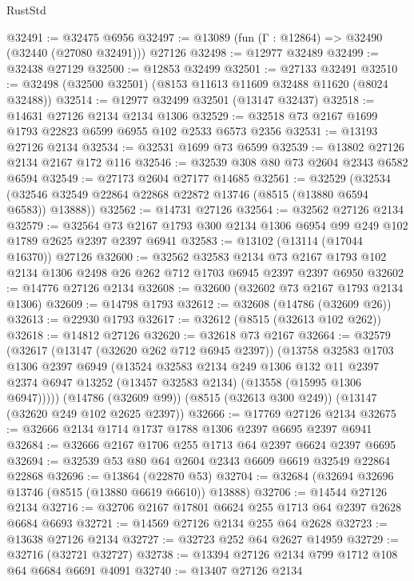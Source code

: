 \begin{lexlean}{RustStd}
\begin{coremodule}
@32491 := @32475 @6956
@32497 := @13089 (fun (Γ : @12864) => @32490 (@32440 (@27080 @32491))) @27126
@32498 := @12977 @32489
@32499 := @32438 @27129
@32500 := @12853 @32499
@32501 := @27133 @32491
@32510 := @32498 (@32500 @32501) (@8153 @11613 @11609 @32488 @11620 (@8024 @32488))
@32514 := @12977 @32499 @32501 (@13147 @32437)
@32518 := @14631 @27126 @2134 @2134 @1306
@32529 := @32518 @73 @2167 @1699 @1793 @22823 @6599 @6955 @102 @2533 @6573 @2356
@32531 := @13193 @27126 @2134
@32534 := @32531 @1699 @73 @6599
@32539 := @13802 @27126 @2134 @2167 @172 @116
@32546 := @32539 @308 @80 @73 @2604 @2343 @6582 @6594
@32549 := @27173 @2604 @27177 @14685
@32561 := @32529
    (@32534 (@32546 @32549 @22864 @22868 @22872 @13746 (@8515 (@13880 @6594 @6583)) @13888))
@32562 := @14731 @27126
@32564 := @32562 @27126 @2134
@32579 := @32564 @73 @2167 @1793 @300 @2134 @1306 @6954 @99 @249 @102 @1789 @2625 @2397 @2397 @6941
@32583 := @13102 (@13114 (@17044 @16370)) @27126
@32600 := @32562
    @32583
    @2134
    @73
    @2167
    @1793
    @102
    @2134
    @1306
    @2498
    @26
    @262
    @712
    @1703
    @6945
    @2397
    @2397
    @6950
@32602 := @14776 @27126 @2134
@32608 := @32600 (@32602 @73 @2167 @1793 @2134 @1306)
@32609 := @14798 @1793
@32612 := @32608 (@14786 (@32609 @26))
@32613 := @22930 @1793
@32617 := @32612 (@8515 (@32613 @102 @262))
@32618 := @14812 @27126
@32620 := @32618 @73 @2167
@32664 := @32579
    (@32617
      (@13147 (@32620 @262 @712 @6945 @2397))
      (@13758
        @32583
        @1703
        @1306
        @2397
        @6949
        (@13524
          @32583
          @2134
          @249
          @1306
          @132
          @11
          @2397
          @2374
          @6947
          @13252
          (@13457 @32583 @2134)
          (@13558 (@15995 @1306 @6947)))))
    (@14786 (@32609 @99))
    (@8515 (@32613 @300 @249))
    (@13147 (@32620 @249 @102 @2625 @2397))
@32666 := @17769 @27126 @2134
@32675 := @32666 @2134 @1714 @1737 @1788 @1306 @2397 @6695 @2397 @6941
@32684 := @32666 @2167 @1706 @255 @1713 @64 @2397 @6624 @2397 @6695
@32694 := @32539 @53 @80 @64 @2604 @2343 @6609 @6619 @32549 @22864 @22868
@32696 := @13864 (@22870 @53)
@32704 := @32684 (@32694 @32696 @13746 (@8515 (@13880 @6619 @6610)) @13888)
@32706 := @14544 @27126 @2134
@32716 := @32706 @2167 @17801 @6624 @255 @1713 @64 @2397 @2628 @6684 @6693
@32721 := @14569 @27126 @2134 @255 @64 @2628
@32723 := @13638 @27126 @2134
@32727 := @32723 @252 @64 @2627 @14959
@32729 := @32716 (@32721 @32727)
@32738 := @13394 @27126 @2134 @799 @1712 @108 @64 @6684 @6691 @4091
@32740 := @13407 @27126 @2134

\end{coremodule}
\end{lexlean}
